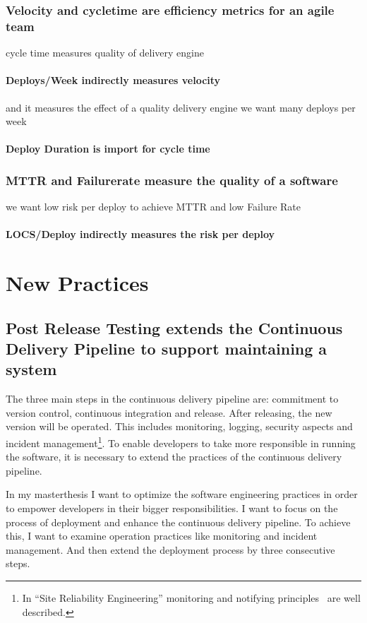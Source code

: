 \section{Velocity and cycletime are efficiency metrics for an agile team}
cycle time measures quality of delivery engine
\subsection{Deploys/Week indirectly measures velocity}
and it measures the effect of a quality delivery engine
we want many deploys per week
\subsection{Deploy Duration is import for cycle time}
\section{MTTR and Failurerate measure the quality of a software}
we want low risk per deploy to achieve MTTR and low Failure Rate
\subsection{LOCS/Deploy indirectly measures the risk per deploy}


\part{New Practices}

\chapter{Post Release Testing extends the Continuous Delivery Pipeline to support maintaining a system}

The three main steps in the continuous delivery pipeline are: commitment to version control, continuous integration and release. After releasing, the new version will be operated. This includes monitoring, logging, security aspects and incident management\footnote{In ``Site Reliability Engineering'' monitoring and notifying principles~\cite[p. 55-63]{site_reliability} are well described.}. To enable developers to take more responsible in running the software, it is necessary to extend the practices of the continuous delivery pipeline.

In my masterthesis I want to optimize the software engineering practices in order to empower developers in their bigger responsibilities. I want to focus on the process of deployment and enhance the continuous delivery pipeline. To achieve this, I want to examine operation practices like monitoring and incident management. And then extend the deployment process by three consecutive steps.

